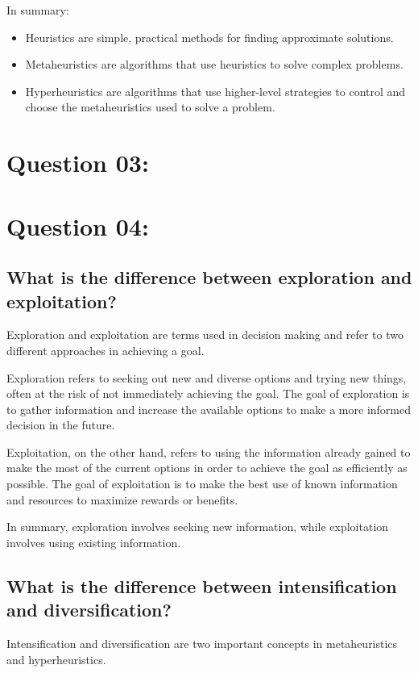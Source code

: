\documentclass[conference]{IEEEtran}
\begin{document}
In summary:
\begin{itemize}
	\item Heuristics are simple, practical methods for finding approximate solutions.
	\item Metaheuristics are algorithms that use heuristics to solve complex problems.
	\item Hyperheuristics are algorithms that use higher-level strategies to control and choose the metaheuristics used to solve a problem.
\end{itemize}

\section{Question 03: }

\section{Question 04: }

\subsection{What is the difference between exploration and exploitation?}

Exploration and exploitation are terms used in decision making and refer to two different approaches in achieving a goal.

Exploration refers to seeking out new and diverse options and trying new things, often at the risk of not immediately achieving the goal. The goal of exploration is to gather information and increase the available options to make a more informed decision in the future.

Exploitation, on the other hand, refers to using the information already gained to make the most of the current options in order to achieve the goal as efficiently as possible. The goal of exploitation is to make the best use of known information and resources to maximize rewards or benefits.

In summary, exploration involves seeking new information, while exploitation involves using existing information.

\subsection{What is the difference between intensification and diversification?}
Intensification and diversification are two important concepts in metaheuristics and hyperheuristics.
\end{document}
